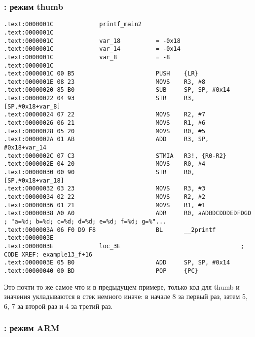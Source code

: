 \subsubsection{\OptimizingKeil: режим thumb}

\begin{lstlisting}
.text:0000001C             printf_main2
.text:0000001C
.text:0000001C             var_18          = -0x18
.text:0000001C             var_14          = -0x14
.text:0000001C             var_8           = -8
.text:0000001C
.text:0000001C 00 B5                       PUSH    {LR}
.text:0000001E 08 23                       MOVS    R3, #8
.text:00000020 85 B0                       SUB     SP, SP, #0x14
.text:00000022 04 93                       STR     R3, [SP,#0x18+var_8]
.text:00000024 07 22                       MOVS    R2, #7
.text:00000026 06 21                       MOVS    R1, #6
.text:00000028 05 20                       MOVS    R0, #5
.text:0000002A 01 AB                       ADD     R3, SP, #0x18+var_14
.text:0000002C 07 C3                       STMIA   R3!, {R0-R2}
.text:0000002E 04 20                       MOVS    R0, #4
.text:00000030 00 90                       STR     R0, [SP,#0x18+var_18]
.text:00000032 03 23                       MOVS    R3, #3
.text:00000034 02 22                       MOVS    R2, #2
.text:00000036 01 21                       MOVS    R1, #1
.text:00000038 A0 A0                       ADR     R0, aADBDCDDDEDFDGD ; "a=%d; b=%d; c=%d; d=%d; e=%d; f=%d; g=%"...
.text:0000003A 06 F0 D9 F8                 BL      __2printf
.text:0000003E
.text:0000003E             loc_3E                                  ; CODE XREF: example13_f+16
.text:0000003E 05 B0                       ADD     SP, SP, #0x14
.text:00000040 00 BD                       POP     {PC}
\end{lstlisting}

Это почти то же самое что и в предыдущем примере, только код для thumb и значения укладываются в 
стек немного иначе: в начале 8 за первый раз, затем 5, 6, 7 за второй раз и 4 за третий раз.

\subsubsection{\OptimizingXcode: режим ARM}

